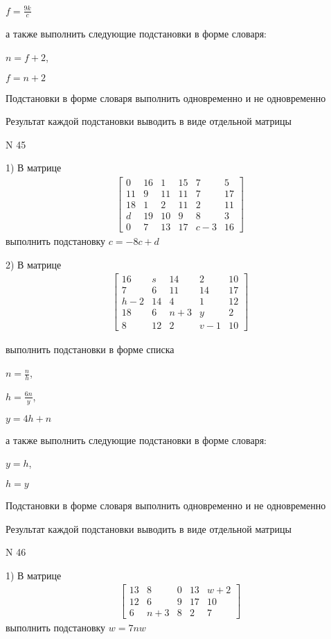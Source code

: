 \documentclass[11pt]{report}
\begin{document}
$f=\frac{9 k}{c}$

а также выполнить следующие подстановки в форме словаря:

$n=f + 2$,

$f=n + 2$


    Подстановки в форме словаря выполнить одновременно и не одновременно


    Результат каждой подстановки выводить в виде отдельной матрицы

\newpage
N 45


    1) В матрице
\begin{align*}
\left[\begin{matrix}0 & 16 & 1 & 15 & 7 & 5\\11 & 9 & 11 & 11 & 7 & 17\\18 & 1 & 2 & 11 & 2 & 11\\d & 19 & 10 & 9 & 8 & 3\\0 & 7 & 13 & 17 & c - 3 & 16\end{matrix}\right]
\end{align*}
выполнить подстановку $c=- 8 c + d$


    2) В матрице
\begin{align*}
\left[\begin{matrix}16 & s & 14 & 2 & 10\\7 & 6 & 11 & 14 & 17\\h - 2 & 14 & 4 & 1 & 12\\18 & 6 & n + 3 & y & 2\\8 & 12 & 2 & v - 1 & 10\end{matrix}\right]
\end{align*}

выполнить подстановки в форме списка

$n=\frac{n}{h}$,

$h=\frac{6 n}{y}$,

$y=4 h + n$

а также выполнить следующие подстановки в форме словаря:

$y=h$,

$h=y$


    Подстановки в форме словаря выполнить одновременно и не одновременно


    Результат каждой подстановки выводить в виде отдельной матрицы

\newpage
N 46


    1) В матрице
\begin{align*}
\left[\begin{matrix}13 & 8 & 0 & 13 & w + 2\\12 & 6 & 9 & 17 & 10\\6 & n + 3 & 8 & 2 & 7\end{matrix}\right]
\end{align*}
выполнить подстановку $w=7 n w$
\end{document}
